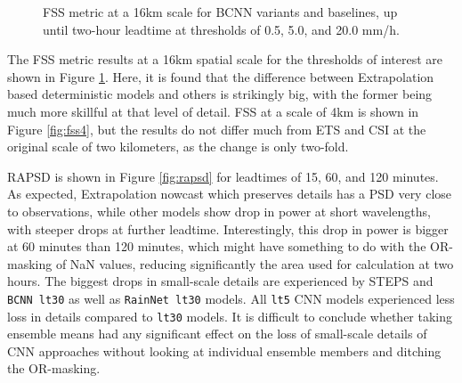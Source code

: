 \begin{figure}[H]
	\caption{FSS metric at a 16km scale for BCNN variants and baselines, up until two-hour leadtime at thresholds of 0.5, 5.0, and 20.0 mm/h.}
	\label{fig:fss16}
\end{figure}

The FSS metric results at a 16km spatial scale for the thresholds of interest are shown in Figure \ref{fig:fss16}. Here, it is found that the difference between Extrapolation based deterministic models and others is strikingly big, with the former being much more skillful at that level of detail. FSS at a scale of 4km is shown in Figure \ref{fig:fss4}, but the results do not differ much from ETS and CSI at the original scale of two kilometers, as the change is only two-fold. 

RAPSD is shown in Figure \ref{fig:rapsd} for leadtimes of 15, 60, and 120 minutes. As expected, Extrapolation nowcast which preserves details has a PSD very close to observations, while other models show drop in power at short wavelengths, with steeper drops at further leadtime. Interestingly, this drop in power is bigger at 60 minutes than 120 minutes, which might have something to do with the OR-masking of NaN values, reducing significantly the area used for calculation at two hours. The biggest drops in small-scale details are experienced by STEPS and \texttt{BCNN lt30} as well as \texttt{RainNet lt30} models. All \texttt{lt5} CNN models experienced less loss in details compared to \texttt{lt30} models. It is difficult to conclude whether taking ensemble means had any significant effect on the loss of small-scale details of CNN approaches without looking at individual ensemble members and ditching the OR-masking.

